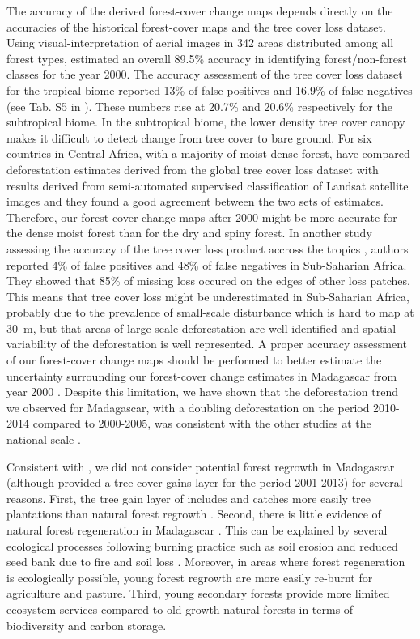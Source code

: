 \documentclass[a4paper, 12pt, leqno]{article} %
\begin{document}
The accuracy of the derived forest-cover change maps depends directly
on the accuracies of the historical forest-cover maps and the tree
cover loss dataset. Using visual-interpretation of aerial images in
342 areas distributed among all forest types, \citet{Harper2007}
estimated an overall 89.5\% accuracy in identifying forest/non-forest
classes for the year 2000. The accuracy assessment of the tree cover
loss dataset for the tropical biome reported 13\% of false positives
and 16.9\% of false negatives (see Tab. S5 in
\citet{Hansen2013}). These numbers rise at 20.7\% and 20.6\%
respectively for the subtropical biome. In the subtropical biome, the
lower density tree cover canopy makes it difficult to detect change
from tree cover to bare ground. For six countries in Central Africa,
with a majority of moist dense forest, \citet{Verhegghen2016} have
compared deforestation estimates derived from the global tree cover
loss dataset \citep{Hansen2013} with results derived from
semi-automated supervised classification of Landsat satellite images
\citep{Achard2014} and they found a good agreement between the two
sets of estimates. Therefore, our forest-cover change maps after 2000
might be more accurate for the dense moist forest than for the dry and
spiny forest. In another study assessing the accuracy of the tree
cover loss product accross the tropics \citep{Tyukavina2015}, authors
reported 4\% of false positives and 48\% of false negatives in
Sub-Saharian Africa. They showed that 85\% of missing loss occured on
the edges of other loss patches. This means that tree cover loss might
be underestimated in Sub-Saharian Africa, probably due to the
prevalence of small-scale disturbance which is hard to map at 30~m,
but that areas of large-scale deforestation are well identified and
spatial variability of the deforestation is well represented. A proper
accuracy assessment of our forest-cover change maps should be
performed to better estimate the uncertainty surrounding our
forest-cover change estimates in Madagascar from year 2000
\citep{Olofsson2013,Olofsson2014}. Despite this limitation, we have
shown that the deforestation trend we observed for Madagascar, with a
doubling deforestation on the period 2010-2014 compared to 2000-2005,
was consistent with the other studies at the national scale
\citep{ONE2015, MEFT2009}.

Consistent with \citet{Harper2007}, we did not consider potential
forest regrowth in Madagascar (although \citet{Hansen2013} provided a
tree cover gains layer for the period 2001-2013) for several
reasons. First, the tree gain layer of \citet{Hansen2013} includes and
catches more easily tree plantations than natural forest regrowth
\citep{Tropek2014}. Second, there is little evidence of natural forest
regeneration in Madagascar \citep{Grouzis2001, Harper2007}. This can
be explained by several ecological processes following burning
practice such as soil erosion \citep{Grinand2017} and reduced seed
bank due to fire and soil loss \citep{Grouzis2001}. Moreover, in areas
where forest regeneration is ecologically possible, young forest
regrowth are more easily re-burnt for agriculture and pasture. Third,
young secondary forests provide more limited ecosystem services
compared to old-growth natural forests in terms of biodiversity and
carbon storage.
\end{document}
